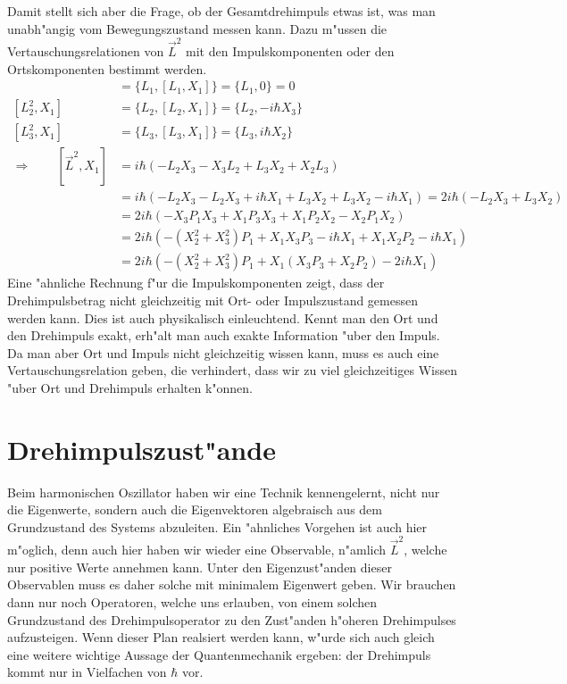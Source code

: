 Damit stellt sich aber die Frage, ob der Gesamtdrehimpuls etwas ist,
was man unabh"angig vom Bewegungszustand messen kann.
Dazu m"ussen die Vertauschungsrelationen von $\vec L^2$ mit den
Impulskomponenten oder den Ortskomponenten bestimmt werden.
\begin{align*}
[L_1^2,X_1]
&=
\{L_1,[L_1,X_1]\}
=\{L_1,0\}=0
\\
[L_2^2,X_1]
&=
\{L_2,[L_2,X_1]\}
=
\{L_2,-i\hbar X_3\}
\\
[L_3^2,X_1]
&=
\{L_3,[L_3,X_1]\}
=
\{L_3, i\hbar X_2\}
\\
\Rightarrow\qquad
[\vec L^2,X_1]
&=
i\hbar(-L_2X_3-X_3L_2+L_3X_2+X_2L_3)
\\
&=
i\hbar(-L_2X_3-L_2X_3+i\hbar X_1 +L_3X_2+L_3X_2-i\hbar X_1)
=
2i\hbar(-L_2X_3 +L_3X_2)
\\
&=
2i\hbar(
-X_3P_1X_3+X_1P_3X_3+X_1P_2X_2-X_2P_1X_2
)
\\
&=
2i\hbar(
-(X_2^2+X_3^2)P_1+X_1X_3P_3-i\hbar X_1+ X_1X_2P_2-i\hbar X_1
)
\\
&=
2i\hbar(
-(X_2^2+X_3^2)P_1
+X_1(X_3P_3 + X_2P_2)
-2i\hbar X_1
)
\end{align*}
Eine "ahnliche Rechnung f"ur die Impulskomponenten zeigt, dass der
Drehimpulsbetrag nicht gleichzeitig mit Ort- oder Impulszustand
gemessen werden kann.
Dies ist auch physikalisch einleuchtend.
Kennt man den Ort und den Drehimpuls exakt, erh"alt man auch exakte
Information "uber den Impuls.
Da man aber Ort und Impuls nicht gleichzeitig wissen kann, muss es auch
eine Vertauschungsrelation geben, die verhindert, dass wir zu viel
gleichzeitiges Wissen "uber Ort und Drehimpuls erhalten k"onnen.

\section{Drehimpulszust"ande\label{section:drehimpulszustaende}}
Beim harmonischen Oszillator haben wir eine Technik kennengelernt, nicht
nur die Eigenwerte, sondern auch die Eigenvektoren algebraisch aus dem
Grundzustand des Systems abzuleiten.
Ein "ahnliches Vorgehen ist auch hier m"oglich, denn auch hier haben wir
wieder eine Observable, n"amlich $\vec L^2$, welche nur positive
Werte annehmen kann.
Unter den Eigenzust"anden dieser Observablen muss es daher solche mit
minimalem Eigenwert geben.
Wir brauchen dann nur noch Operatoren, welche uns erlauben, von einem
solchen Grundzustand des Drehimpulsoperator zu den Zust"anden 
h"oheren Drehimpulses aufzusteigen.
Wenn dieser Plan realsiert werden kann, w"urde sich auch gleich
eine weitere wichtige Aussage der Quantenmechanik ergeben: der Drehimpuls
kommt nur in Vielfachen von $\hbar$ vor.

